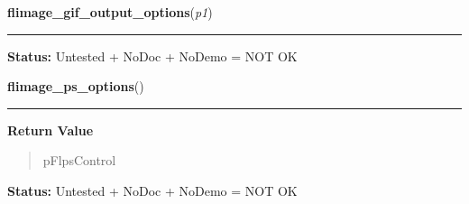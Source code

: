     \label{xformslib:library:flimage_gif_output_options}

    \vspace{0.5ex}

\hspace{.8\funcindent}\begin{boxedminipage}{\funcwidth}

    \raggedright \textbf{flimage\_gif\_output\_options}(\textit{p1})

    \vspace{-1.5ex}

    \rule{\textwidth}{0.5\fboxrule}
\setlength{\parskip}{2ex}
\setlength{\parskip}{1ex}
\textbf{Status:} Untested + NoDoc + NoDemo = NOT OK



    \end{boxedminipage}

    \label{xformslib:library:flimage_ps_options}

    \vspace{0.5ex}

\hspace{.8\funcindent}\begin{boxedminipage}{\funcwidth}

    \raggedright \textbf{flimage\_ps\_options}()

    \vspace{-1.5ex}

    \rule{\textwidth}{0.5\fboxrule}
\setlength{\parskip}{2ex}
\setlength{\parskip}{1ex}
      \textbf{Return Value}
    \vspace{-1ex}

      \begin{quote}
      pFlpsControl

      \end{quote}

\textbf{Status:} Untested + NoDoc + NoDemo = NOT OK



    \end{boxedminipage}

    \label{xformslib:library:flimage_jpeg_output_options}

